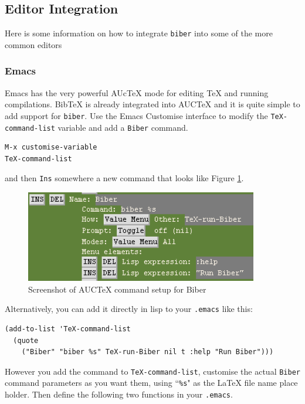 \documentclass{ltxdockit}
\begin{document}
\subsection{Editor Integration}

Here is some information on how to integrate \verb+biber+ into some of the
more common editors

\subsubsection{Emacs}

Emacs has the very powerful AUcTeX mode for editing TeX and running
compilations. BibTeX is already integrated into AUCTeX and it is quite
simple to add support for \verb+biber+. Use the Emacs Customise interface to
modify the \verb+TeX-command-list+ variable and add a \verb+Biber+ command.

\begin{verbatim}
M-x customise-variable
TeX-command-list
\end{verbatim}

\noindent and then \verb+Ins+ somewhere a new command that looks like
Figure \ref{fig:biber-auctex}.

\begin{figure}[!htbp]
  \centering
  \includegraphics[width=4in,keepaspectratio=true]{biber-auctex.png}
  \caption{Screenshot of AUCTeX command setup for Biber}
  \label{fig:biber-auctex}
\end{figure}

\noindent Alternatively, you can add it directly in lisp to your \verb+.emacs+ like
this:

\begin{verbatim}
(add-to-list 'TeX-command-list
  (quote
    ("Biber" "biber %s" TeX-run-Biber nil t :help "Run Biber")))
\end{verbatim}

\noindent However you add the command to \verb+TeX-command-list+, customise the
actual \verb+Biber+ command parameters as you want them, using ``\verb+%s+" as
the LaTeX file name place holder. Then define the following two functions
in your \verb+.emacs+.
\end{document}
